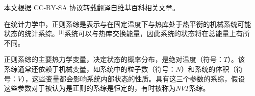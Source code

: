 
本文根据 CC-BY-SA 协议转载翻译自维基百科\href{https://en.wikipedia.org/wiki/Canonical_ensemble}{相关文章}。

在统计力学中，正则系综是表示与在固定温度下与热库处于热平衡的机械系统可能状态的统计系综。\(^\text{[1]}\)系统可以与热库交换能量，因此系统的状态将在总能量上有所不同。

正则系综的主要热力学变量，决定状态的概率分布，是绝对温度（符号：\(T\)）。该系综通常还依赖于机械变量，如系统中的粒子数（符号：\(N\)）和系统的体积（符号：\(V\)），这些变量都会影响系统内部状态的性质。具有这三个参数的系综，假设这些参数对于被认为是正则的系综是恒定的，有时被称为\(NVT\)系综。


